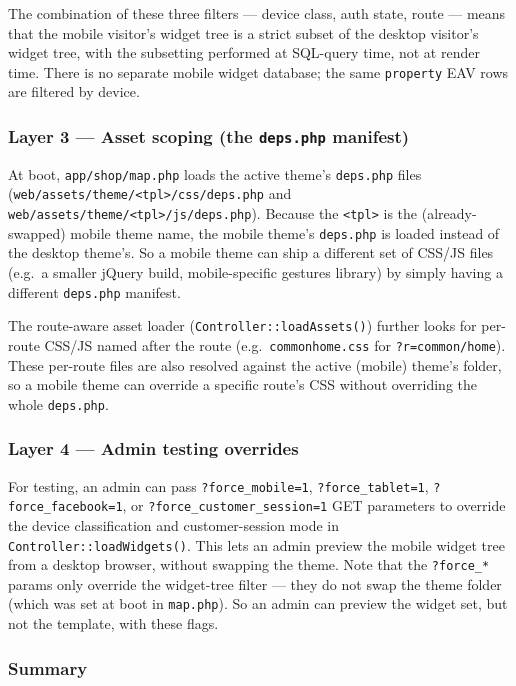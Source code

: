 \documentclass[11pt,a4paper]{article}
\begin{document}
The combination of these three filters --- device class,
auth state, route --- means that the mobile visitor's widget tree
is a strict subset of the desktop visitor's widget tree, with the
subsetting performed at SQL-query time, not at render time. There
is no separate mobile widget database; the same
\texttt{property} EAV rows are filtered by device.

\subsubsection{Layer 3 --- Asset scoping (the \texttt{deps.php} manifest)}

At boot, \texttt{app/shop/map.php} loads the active theme's
\texttt{deps.php} files (\texttt{web/assets/theme/<tpl>/css/deps.php}
and \texttt{web/assets/theme/<tpl>/js/deps.php}). Because the
\texttt{<tpl>} is the (already-swapped) mobile theme name, the
mobile theme's \texttt{deps.php} is loaded instead of the desktop
theme's. So a mobile theme can ship a different set of CSS/JS
files (e.g.\ a smaller jQuery build, mobile-specific gestures
library) by simply having a different \texttt{deps.php} manifest.

The route-aware asset loader (\texttt{Controller::loadAssets()})
further looks for per-route CSS/JS named after the route (e.g.\
\texttt{commonhome.css} for \texttt{?r=common/home}). These
per-route files are also resolved against the active (mobile)
theme's folder, so a mobile theme can override a specific
route's CSS without overriding the whole \texttt{deps.php}.

\subsubsection{Layer 4 --- Admin testing overrides}

For testing, an admin can pass \texttt{?force\_mobile=1},
\texttt{?force\_tablet=1}, \texttt{?force\_facebook=1}, or
\texttt{?force\_customer\_session=1} GET parameters to override
the device classification and customer-session mode in
\texttt{Controller::loadWidgets()}. This lets an admin preview
the mobile widget tree from a desktop browser, without swapping
the theme. Note that the \texttt{?force\_*} params only override
the widget-tree filter --- they do not swap the theme folder
(which was set at boot in \texttt{map.php}). So an admin can
preview the widget set, but not the template, with these flags.

\subsubsection{Summary}
\end{document}
